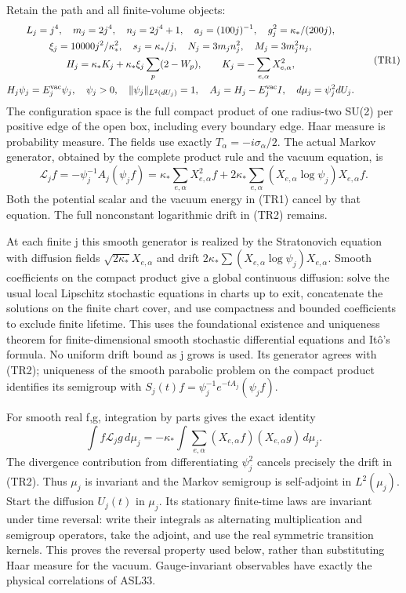 \documentclass[11pt]{article}
\begin{document}
Retain the path and all finite-volume objects:
\[
\begin{gathered}
 L_j=j^4,\quad m_j=2j^4,\quad n_j=2j^4+1,\quad
 a_j=(100j)^{-1},\quad g_j^2=\kappa_*/(200j),\\
 \xi_j=10000j^2/\kappa_*^2,\quad s_j=\kappa_*/j,\quad
 N_j=3m_jn_j^2,\quad M_j=3m_j^2n_j,\\
 H_j=\kappa_*K_j+\kappa_*\xi_j\sum_p(2-W_p),\qquad
 K_j=-\sum_{e,\alpha}X_{e,\alpha}^2,\\
 H_j\psi_j=E_j^{\rm vac}\psi_j,\quad \psi_j>0,\quad
 \|\psi_j\|_{L^2(dU_j)}=1,\quad A_j=H_j-E_j^{\rm vac}I,
 \quad d\mu_j=\psi_j^2dU_j.
\end{gathered}\tag{TR1}
\]
The configuration space is the full compact product of one radius-two SU(2) per positive edge of the open box, including every boundary edge. Haar measure is probability measure. The fields use exactly \(T_\alpha=-i\sigma_\alpha/2\). The actual Markov generator, obtained by the complete product rule and the vacuum equation, is
\[
 \mathcal L_j f=-\psi_j^{-1}A_j(\psi_j f)
 =\kappa_*\sum_{e,\alpha}X_{e,\alpha}^2f
   +2\kappa_*\sum_{e,\alpha}(X_{e,\alpha}\log\psi_j)X_{e,\alpha}f.
 \tag{TR2}
\]
Both the potential scalar and the vacuum energy in (TR1) cancel by that equation. The full nonconstant logarithmic drift in (TR2) remains.

At each finite j this smooth generator is realized by the Stratonovich equation with diffusion fields \(\sqrt{2\kappa_*}X_{e,\alpha}\) and drift \(2\kappa_*\sum(X_{e,\alpha}\log\psi_j)X_{e,\alpha}\). Smooth coefficients on the compact product give a global continuous diffusion: solve the usual local Lipschitz stochastic equations in charts up to exit, concatenate the solutions on the finite chart cover, and use compactness and bounded coefficients to exclude finite lifetime. This uses the foundational existence and uniqueness theorem for finite-dimensional smooth stochastic differential equations and Itô's formula. No uniform drift bound as j grows is used. Its generator agrees with (TR2); uniqueness of the smooth parabolic problem on the compact product identifies its semigroup with \(S_j(t)f=\psi_j^{-1}e^{-tA_j}(\psi_jf)\).

For smooth real f,g, integration by parts gives the exact identity
\[
 \int f\mathcal L_jg\,d\mu_j
 =-\kappa_*\int\sum_{e,\alpha}(X_{e,\alpha}f)(X_{e,\alpha}g)\,d\mu_j.
 \tag{TR3}
\]
The divergence contribution from differentiating \(\psi_j^2\) cancels precisely the drift in (TR2). Thus \(\mu_j\) is invariant and the Markov semigroup is self-adjoint in \(L^2(\mu_j)\). Start the diffusion \(U_j(t)\) in \(\mu_j\). Its stationary finite-time laws are invariant under time reversal: write their integrals as alternating multiplication and semigroup operators, take the adjoint, and use the real symmetric transition kernels. This proves the reversal property used below, rather than substituting Haar measure for the vacuum. Gauge-invariant observables have exactly the physical correlations of ASL33.
\end{document}
